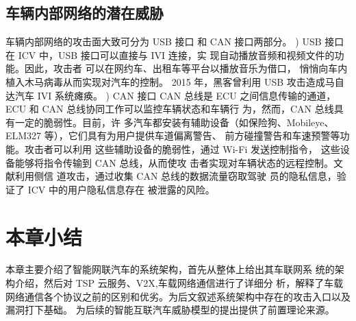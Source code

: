 \subsection{车辆内部网络的潜在威胁}
车辆内部网络的攻击面大致可分为 USB 接口
和 CAN 接口两部分。
) USB 接口
在 ICV 中，USB 接口可以直接与 IVI 连接，实
现自动播放音频和视频文件的功能。因此，攻击者
可以在网约车、出租车等平台以播放音乐为借口，
悄悄向车内植入木马病毒从而实现对汽车的控制。
2015 年，黑客曾利用 USB 攻击造成马自达汽车 IVI
系统瘫痪。
) CAN 接口
CAN 总线是 ECU 之间信息传输的通道，ECU
和 CAN 总线协同工作可以监控车辆状态和车辆行
为，然而，CAN 总线具有一定的脆弱性。目前，许
多汽车都安装有辅助设备（如保险狗、Mobileye、
ELM327 等），它们具有为用户提供车道偏离警告、
前方碰撞警告和车速预警等功能。攻击者可以利用
这些辅助设备的脆弱性，通过 Wi-Fi 发送控制指令，
这些设备能够将指令传输到 CAN 总线，从而使攻
击者实现对车辆状态的远程控制。文献\cite{koscher2010experimental}利用侧信
道攻击，通过收集 CAN 总线的数据流量窃取驾驶
员的隐私信息，验证了 ICV 中的用户隐私信息存在
被泄露的风险。
\section{本章小结}

本章主要介绍了智能网联汽车的系统架构，首先从整体上给出其车联网系
统的架构介绍，然后对 TSP 云服务、V2X,车载网络通信进行了详细分
析，解释了车载网络通信各个协议之前的区别和优劣。为后文叙述系统架构中存在的攻击入口以及漏洞打下基础。
为后续的智能互联汽车威胁模型的提出提供了前置理论来源。
